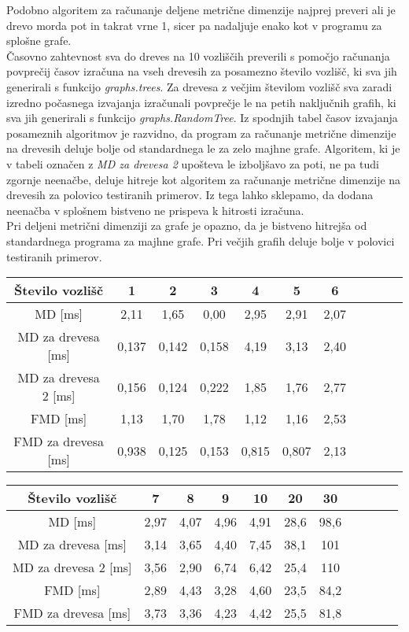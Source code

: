 \documentclass[a4paper]{report}
\begin{document}
Podobno algoritem za računanje deljene metrične dimenzije najprej preveri ali je drevo morda pot in takrat vrne 1, sicer pa nadaljuje enako kot v programu za splošne grafe. \\ 

Časovno zahtevnost sva do dreves na 10 vozliščih preverili s pomočjo računanja povprečij časov izračuna na vseh drevesih za posamezno število vozlišč, ki sva jih generirali s funkcijo \textit{graphs.trees}. Za drevesa z večjim številom vozlišč sva zaradi izredno počasnega izvajanja izračunali povprečje le na petih naključnih grafih, ki sva jih generirali s funkcijo \textit{graphs.RandomTree}. Iz spodnjih tabel časov izvajanja posameznih algoritmov je razvidno, da program za računanje metrične dimenzije na drevesih deluje bolje od standardnega le za zelo majhne grafe. Algoritem, ki je v tabeli označen z \textit{MD za drevesa 2} upošteva le izboljšavo za poti, ne pa tudi zgornje neenačbe, deluje hitreje kot algoritem za računanje metrične dimenzije na drevesih za polovico testiranih primerov. Iz tega lahko sklepamo, da dodana neenačba v splošnem bistveno ne prispeva k hitrosti izračuna. \\

Pri deljeni metrični dimenziji za grafe je opazno, da je bistveno hitrejša od standardnega programa za majhne grafe. Pri večjih grafih deluje bolje v polovici testiranih primerov.

\begin{center}
\begin{tabular}{||c| |*{10}{c|}|}
\hline\hline
Število vozlišč & 1 & 2 & 3 & 4 & 5 & 6 \\
\hline\hline
MD [ms] & 2,11 & 1,65 & 0,00 & 2,95 & 2,91 & 2,07 \\
\hline
MD za drevesa [ms] & 0,137 & 0,142 & 0,158 & 4,19 & 3,13 & 2,40 \\
\hline
MD za drevesa 2 [ms] & 0,156 & 0,124 & 0,222 & 1,85 & 1,76 & 2,77 \\
\hline\hline
FMD [ms] & 1,13 & 1,70 & 1,78 & 1,12 & 1,16 & 2,53 \\
\hline
FMD za drevesa [ms] & 0,938 & 0,125 & 0,153 & 0,815 & 0,807 & 2,13 \\
\hline\hline
\end{tabular}
\end{center}

\begin{center}
\begin{tabular}{||c| |*{10}{c|}|}
\hline\hline
Število vozlišč & 7 & 8 & 9 & 10 & 20 & 30 \\
\hline\hline
MD [ms] &  2,97 & 4,07 & 4,96 & 4,91 &  28,6 & 98,6 \\
\hline
MD za drevesa [ms] & 3,14 & 3,65 & 4,40 & 7,45 & 38,1 & 101 \\
\hline
MD za drevesa 2 [ms] & 3,56 & 2,90 & 6,74 & 6,42 & 25,4 & 110 \\
\hline\hline
FMD [ms] & 2,89 & 4,43 & 3,28 & 4,60 & 23,5 & 84,2 \\
\hline
FMD za drevesa [ms] & 3,73 & 3,36 & 4,23 & 4,42 & 25,5 & 81,8 \\
\hline\hline
\end{tabular}
\end{center}
\end{document}
